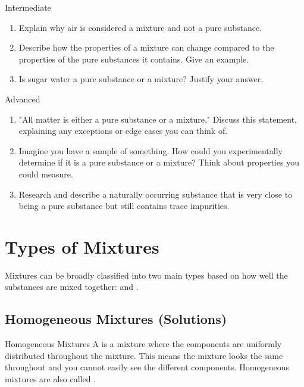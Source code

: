 \begin{tieredquestions}{Intermediate}
\begin{enumerate}
    \item Explain why air is considered a mixture and not a pure substance.
    \item Describe how the properties of a mixture can change compared to the properties of the pure substances it contains. Give an example.
    \item  Is sugar water a pure substance or a mixture? Justify your answer.
\end{enumerate}
\end{tieredquestions}

\begin{tieredquestions}{Advanced}
\begin{enumerate}
    \item  "All matter is either a pure substance or a mixture."  Discuss this statement, explaining any exceptions or edge cases you can think of.
    \item  Imagine you have a sample of something. How could you experimentally determine if it is a pure substance or a mixture?  Think about properties you could measure.
    \item  Research and describe a naturally occurring substance that is very close to being a pure substance but still contains trace impurities.
\end{enumerate}
\end{tieredquestions}


\section{Types of Mixtures}

Mixtures can be broadly classified into two main types based on how well the substances are mixed together:  and .

\subsection{Homogeneous Mixtures (Solutions)}


\begin{keyconcept}{Homogeneous Mixtures}
A  is a mixture where the components are uniformly distributed throughout the mixture. This means the mixture looks the same throughout and you cannot easily see the different components. Homogeneous mixtures are also called .
\end{keyconcept}

